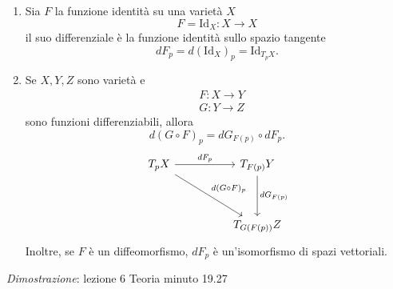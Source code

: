 \documentclass[10pt, letterpaper]{report}
\begin{document}
\begin{proposizione}
    \begin{enumerate}
    \item Sia $F$ la funzione identità su una varietà $X$\begin{equation}
        F=\text{Id}_X:X\rightarrow X
    \end{equation}
    il suo differenziale è la funzione identità sullo spazio tangente\begin{equation}
        dF_p=d(\text{Id}_X)_p=\text{Id}_{T_pX}.
    \end{equation}
    \item Se $X,Y,Z$ sono varietà e \begin{align}
        &F:X\rightarrow Y\\ 
        &G:Y\rightarrow Z
    \end{align}
    sono funzioni differenziabili, allora\begin{equation}
        d(G\circ F)_p=dG_{F(p)}\circ dF_p.
    \end{equation}
\[
\begin{tikzcd}[column sep=huge, row sep=huge]
T_p X \arrow[r, "dF_p"] \arrow[dr, "d(G \circ F)_p"] & T_{F(p)} Y \arrow[d, "dG_{F(p)}"] \\
& T_{G(F(p))} Z
\end{tikzcd}
\]
Inoltre, se $F$ è un diffeomorfismo, $dF_p$ è un'isomorfismo di spazi vettoriali.
\end{enumerate}
\end{proposizione}
\textit{Dimostrazione}:
lezione 6 Teoria minuto 19.27
\end{document}

